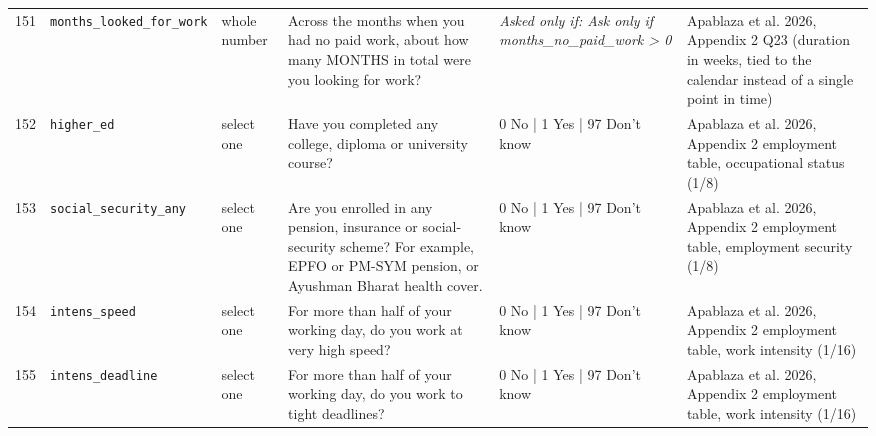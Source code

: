 \documentclass[9pt,a4paper,landscape]{article}
\begin{document}
\begin{longtable}{@{}p{0.5cm}p{3.3cm}p{1.7cm}p{7.3cm}p{5.6cm}p{5.4cm}@{}}
\footnotesize 151 & \footnotesize\texttt{months\_looked\_for\_work} & \scriptsize whole number & \footnotesize Across the months when you had no paid work, about how many MONTHS in total were you looking for work?\par\vspace{1pt}{\footnotesize\color{hdr}{\hifont जिन महीनों में आपके पास कोई पैसे वाला काम नहीं था, उनमें कुल मिलाकर लगभग कितने महीने आप काम ढूँढते रहे?}} & \scriptsize \textit{Asked only if: Ask only if months\_no\_paid\_work > 0} & \scriptsize Apablaza et al. 2026, Appendix 2 Q23 (duration in weeks, tied to the calendar instead of a single point in time)\\
\footnotesize 152 & \footnotesize\texttt{higher\_ed} & \scriptsize select one & \footnotesize Have you completed any college, diploma or university course?\par\vspace{1pt}{\footnotesize\color{hdr}{\hifont क्या आपने कॉलेज, डिप्लोमा या यूनिवर्सिटी का कोई कोर्स पूरा किया है?}} & \scriptsize 0 No | 1 Yes | 97 Don't know & \scriptsize Apablaza et al. 2026, Appendix 2 employment table, occupational status (1/8)\\
\footnotesize 153 & \footnotesize\texttt{social\_security\_any} & \scriptsize select one & \footnotesize Are you enrolled in any pension, insurance or social-security scheme? For example, EPFO or PM-SYM pension, or Ayushman Bharat health cover.\par\vspace{1pt}{\footnotesize\color{hdr}{\hifont क्या आप किसी पेंशन, बीमा या सरकारी सामाजिक सुरक्षा योजना में शामिल हैं? जैसे EPFO या PM-SYM पेंशन, या आयुष्मान भारत स्वास्थ्य कवर।}} & \scriptsize 0 No | 1 Yes | 97 Don't know & \scriptsize Apablaza et al. 2026, Appendix 2 employment table, employment security (1/8)\\
\footnotesize 154 & \footnotesize\texttt{intens\_speed} & \scriptsize select one & \footnotesize For more than half of your working day, do you work at very high speed?\par\vspace{1pt}{\footnotesize\color{hdr}{\hifont काम के दिन के आधे से ज़्यादा समय, क्या आप बहुत तेज़ रफ़्तार से काम करते हैं?}} & \scriptsize 0 No | 1 Yes | 97 Don't know & \scriptsize Apablaza et al. 2026, Appendix 2 employment table, work intensity (1/16)\\
\footnotesize 155 & \footnotesize\texttt{intens\_deadline} & \scriptsize select one & \footnotesize For more than half of your working day, do you work to tight deadlines?\par\vspace{1pt}{\footnotesize\color{hdr}{\hifont काम के दिन के आधे से ज़्यादा समय, क्या आपको कड़ी समय-सीमा में काम करना पड़ता है?}} & \scriptsize 0 No | 1 Yes | 97 Don't know & \scriptsize Apablaza et al. 2026, Appendix 2 employment table, work intensity (1/16)\\

\end{longtable}
\end{document}
